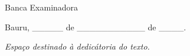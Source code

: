 \documentclass[
	12pt,				%
	openright,			%
	oneside,			%
	a4paper,			%
	
	
	english,			%
	french,				%
	spanish,			%
	brazil				%
]{abntex2}
\begin{document}
\begin{folhadeaprovacao}

  \begin{center}
    {\ABNTEXchapterfont\large\imprimirautor}

    \vspace*{\fill}\vspace*{\fill}
    \begin{center}
      \ABNTEXchapterfont\bfseries\Large\imprimirtitulo
    \end{center}
    \vspace*{\fill}
    
    \hspace{.45\textwidth}
    \begin{minipage}{.5\textwidth}
        \imprimirpreambulo
    \end{minipage}%
    \vspace*{\fill}
   \end{center}
        
   \center Banca Examinadora

      
   \begin{center}
    \vspace*{0.5cm}
    \par
    {Bauru, \_\_\_\_\_ de \_\_\_\_\_\_\_\_\_\_\_ de \_\_\_\_.}
    \vspace*{1cm}
  \end{center}
  
\end{folhadeaprovacao}

\begin{dedicatoria}
   \vspace*{\fill}
   \centering
   \noindent
   \textit{Espaço destinado à dedicátoria do texto.} \vspace*{\fill}
\end{dedicatoria}
\end{document}

